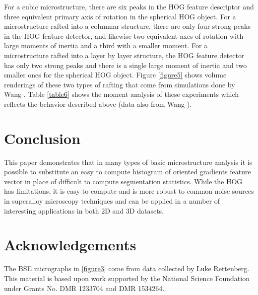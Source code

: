 \documentclass[review]{elsarticle}
\begin{document}
	For a cubic microstructure, there are six peaks in the HOG feature descriptor and three equivalent primary axis of rotation in the spherical HOG object. For a microstructure rafted into a columnar structure, there are only four strong peaks in the HOG feature detector, and likewise two equivalent axes of rotation with large moments of inertia and a third with a smaller moment. For a microstructure rafted into a layer by layer structure, the HOG feature detector has only two strong peaks and there is a single large moment of inertia and two smaller ones for the spherical HOG object. Figure \ref{figure5} shows volume renderings of these two types of rafting that come from simulations done by Wang \cite{ywang2}. Table \ref{table6} shows the moment analysis of these experiments which reflects the behavior described above (data also from Wang \cite{ywang2}).
	
	\section{Conclusion}
	
	This paper demonstrates that in many types of basic microstructure analysis it is possible to substitute an easy to compute histogram of oriented gradients feature vector in place of difficult to compute segmentation statistics. While the HOG has limitations, it is easy to compute and is more robust to common noise sources in superalloy microscopy techniques and can be applied in a number of interesting applications in both 2D and 3D datasets.
	
	\section{Acknowledgements}
	
	The BSE micrographs in \ref{figure3} come from data collected by Luke Rettenberg. This material is based upon work supported by the National Science Foundation under Grants No. DMR 1233704 and DMR 1534264.

	
\end{document}
